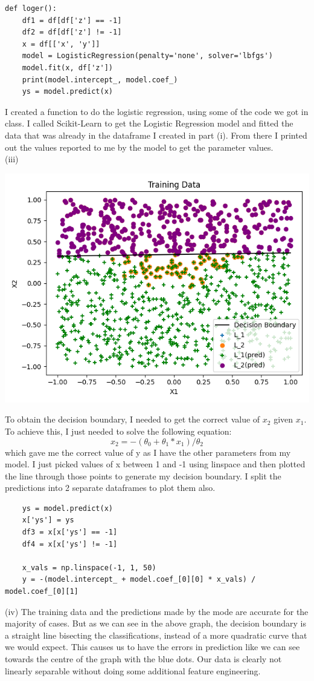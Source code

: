 \documentclass[10pt,a4paper]{article}
\begin{document}
\begin{verbatim}
def loger():
    df1 = df[df['z'] == -1]
    df2 = df[df['z'] != -1]
    x = df[['x', 'y']]
    model = LogisticRegression(penalty='none', solver='lbfgs')
    model.fit(x, df['z'])
    print(model.intercept_, model.coef_)
    ys = model.predict(x)
\end{verbatim}
I created a function to do the logistic regression, using some of the code we got in class. I called Scikit-Learn to get the Logistic Regression model and fitted the data that was already in the dataframe I created in part (i). From there I printed out the values reported to me by the model to get the parameter values. \\
(iii)
\begin{center}
\includegraphics[scale=0.5]{x1vx2pred.jpg}
\end{center}
To obtain the decision boundary, I needed to get the correct value of \(x_2\) given \(x_1\). To achieve this, I just needed to solve the following equation: \[x_2 = -(\theta_0 + \theta_1*x_1)/\theta_2\] which gave me the correct value of y as I have the other parameters from my model. I just picked values of x between 1 and -1 using linspace and then plotted the line through those points to generate my decision boundary. I split the predictions into 2 separate dataframes to plot them also. 
\begin{verbatim}
    ys = model.predict(x)
    x['ys'] = ys
    df3 = x[x['ys'] == -1]
    df4 = x[x['ys'] != -1]

    x_vals = np.linspace(-1, 1, 50)
    y = -(model.intercept_ + model.coef_[0][0] * x_vals) / model.coef_[0][1]
\end{verbatim}
(iv)
The training data and the predictions made by the mode are accurate for the majority of cases. But as we can see in the above graph, the decision boundary is a straight line bisecting the classifications, instead of a more quadratic curve that we would expect. This causes us to have the errors in prediction like we can see towards the centre of the graph with the blue dots. Our data is clearly not linearly separable without doing some additional feature engineering. 
\end{document}
